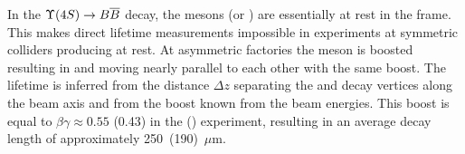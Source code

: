 \begin{enumerate}
In the $\Ups\rightarrow B \bar{B}$ decay, the \B mesons (\Bu or \Bd) are
essentially at rest in the \Ups frame.  This makes direct lifetime
measurements impossible in experiments at symmetric colliders producing 
\Ups at rest. 
At asymmetric \B factories the \Ups meson is boosted
resulting in \B and  moving nearly parallel to each 
other with the same boost. The lifetime is inferred from the distance $\Delta z$        
separating the \B and  decay vertices along the beam axis 
and from the \Ups boost known from the beam energies. This boost is equal to 
$\beta \gamma \approx 0.55$ (0.43) in the \babar (\belle) experiment,
resulting in an average \B decay length of approximately 250~(190)~$\mu$m. 




\end{enumerate}
